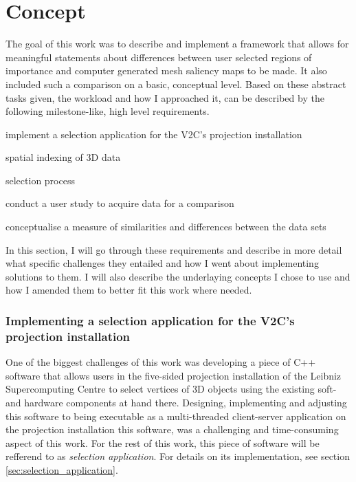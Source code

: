 \chapter{Concept}
\label{sec:concept}


The goal of this work was to describe and implement a framework that allows for meaningful statements about differences between user selected regions of importance and computer generated mesh saliency maps to be made. It also included such a comparison on a basic, conceptual level. Based on these abstract tasks given, the workload and how I approached it, can be described by the following milestone-like, high level requirements.

\begin{enumerate*}
	\item implement a selection application for the V2C's projection installation
	\begin{enumerate*}
		\item spatial indexing of 3D data
		\item selection process
	\end{enumerate*}
	\item conduct a user study to acquire data for a comparison
	\item conceptualise a measure of similarities and differences between the data sets
\end{enumerate*}

In this section, I will go through these requirements and describe in more detail what specific challenges they entailed and how I went about implementing solutions to them. I will also describe the underlaying concepts I chose to use and how I amended them to better fit this work where needed.

	\subsection{Implementing a selection application for the V2C's projection installation}
	\label{sec:implementing_selection_application_v2c}
One of the biggest challenges of this work was developing a piece of C++ software that allows users in the five-sided projection installation of the Leibniz Supercomputing Centre to select vertices of 3D objects using the existing soft- and hardware components at hand there. Designing, implementing and adjusting this software to being executable as a multi-threaded client-server application on the projection installation this software, was a challenging and time-consuming aspect of this work. For the rest of this work, this piece of software will be refferend to as \textit{selection application}. For details on its implementation, see section \ref{sec:selection_application}.

